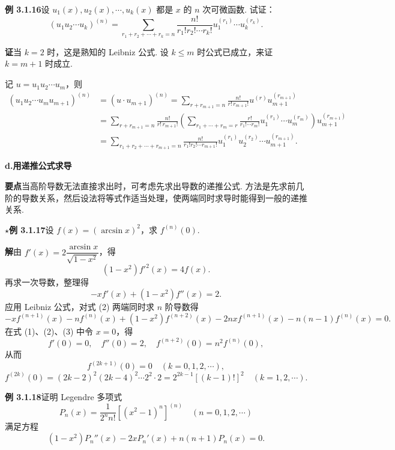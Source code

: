 \documentclass[UTF8,12pt,a4paper,fontset=fandol]{ctexart}
\begin{document}
\noindent\textbf{例 3.1.16}\quad 设 $u_1(x),u_2(x),\cdots,u_k(x)$ 都是 $x$ 的 $n$ 次可微函数. 试证：
\[
  (u_1u_2\cdots u_k)^{(n)}
  =\sum_{r_1+r_2+\cdots+r_k=n}
  \frac{n!}{r_1!r_2!\cdots r_k!}u_1^{(r_1)}\cdots u_k^{(r_k)}.
\]

\noindent\textbf{证}\quad 当 $k=2$ 时，这是熟知的 Leibniz 公式. 设 $k\le m$ 时公式已成立，来证 $k=m+1$ 时成立.

记 $u=u_1u_2\cdots u_m$，则
\[
\begin{aligned}
(u_1u_2\cdots u_m u_{m+1})^{(n)}
&=(u\cdot u_{m+1})^{(n)}
=\sum_{r+r_{m+1}=n}\frac{n!}{r!\,r_{m+1}!}u^{(r)}u_{m+1}^{(r_{m+1})}\\
&=\sum_{r+r_{m+1}=n}\frac{n!}{r!\,r_{m+1}!}
\left(\sum_{r_1+\cdots+r_m=r}
\frac{r!}{r_1!\cdots r_m!}u_1^{(r_1)}\cdots u_m^{(r_m)}\right)
u_{m+1}^{(r_{m+1})}\\
&=\sum_{r_1+r_2+\cdots+r_{m+1}=n}
\frac{n!}{r_1!r_2!\cdots r_{m+1}!}
u_1^{(r_1)}u_2^{(r_2)}\cdots u_{m+1}^{(r_{m+1})}.
\end{aligned}
\]

\noindent\textbf{d.\quad 用递推公式求导}

\noindent\textbf{要点}\quad 当高阶导数无法直接求出时，可考虑先求出导数的递推公式. 方法是先求前几阶的导数关系，然后设法将等式作适当处理，使两端同时求导时能得到一般的递推关系.

\noindent\textbf{$\star$例 3.1.17}\quad 设 $f(x)=(\arcsin x)^2$，求 $f^{(n)}(0)$.

\noindent\textbf{解}\quad 由 $f'(x)=2\dfrac{\arcsin x}{\sqrt{1-x^2}}$，得
\begin{equation}
  (1-x^2)f'^2(x)=4f(x).
\tag{1}
\end{equation}
再求一次导数，整理得
\begin{equation}
  -xf'(x)+(1-x^2)f''(x)=2.
\tag{2}
\end{equation}
应用 Leibniz 公式，对式 (2) 两端同时求 $n$ 阶导数得
\begin{equation}
  -xf^{(n+1)}(x)-nf^{(n)}(x)+(1-x^2)f^{(n+2)}(x)
  -2nxf^{(n+1)}(x)-n(n-1)f^{(n)}(x)=0.
\tag{3}
\end{equation}
在式 (1)、(2)、(3) 中令 $x=0$，得
\[
  f'(0)=0,\quad f''(0)=2,\quad f^{(n+2)}(0)=n^2f^{(n)}(0),
\]
从而
\[
  f^{(2k+1)}(0)=0\quad(k=0,1,2,\cdots),
\]
\[
  f^{(2k)}(0)=(2k-2)^2(2k-4)^2\cdots2^2\cdot2
  =2^{2k-1}[(k-1)!]^2\quad(k=1,2,\cdots).
\]

\noindent\textbf{例 3.1.18}\quad 证明 Legendre 多项式
\[
  P_n(x)=\frac1{2^n n!}\left[(x^2-1)^n\right]^{(n)}\quad(n=0,1,2,\cdots)
\]
满足方程
\[
  (1-x^2)P_n''(x)-2xP_n'(x)+n(n+1)P_n(x)=0.
\]
\end{document}
